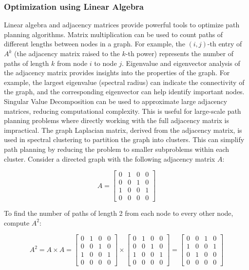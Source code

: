 \documentclass[12pt]{article}
\begin{document}
\subsubsection{Optimization using Linear Algebra}


Linear algebra and adjacency matrices provide powerful tools to optimize path planning algorithms. Matrix multiplication can be used to count paths of different lengths between nodes in a graph. For example, the \( (i,j) \)-th entry of \( A^k \) (the adjacency matrix raised to the \( k \)-th power) represents the number of paths of length \( k \) from node \( i \) to node \( j \).
Eigenvalue and eigenvector analysis of the adjacency matrix provides insights into the properties of the graph. For example, the largest eigenvalue (spectral radius) can indicate the connectivity of the graph, and the corresponding eigenvector can help identify important nodes. Singular Value Decomposition can be used to approximate large adjacency matrices, reducing computational complexity. This is useful for large-scale path planning problems where directly working with the full adjacency matrix is impractical. The graph Laplacian matrix, derived from the adjacency matrix, is used in spectral clustering to partition the graph into clusters. This can simplify path planning by reducing the problem to smaller subproblems within each cluster. Consider a directed graph with the following adjacency matrix \( A \):

\[
A = \begin{bmatrix}
0 & 1 & 0 & 0 \\
0 & 0 & 1 & 0 \\
1 & 0 & 0 & 1 \\
0 & 0 & 0 & 0
\end{bmatrix}
\]

To find the number of paths of length 2 from each node to every other node, compute \( A^2 \):

\[
A^2 = A \times A = \begin{bmatrix}
0 & 1 & 0 & 0 \\
0 & 0 & 1 & 0 \\
1 & 0 & 0 & 1 \\
0 & 0 & 0 & 0
\end{bmatrix}
\times
\begin{bmatrix}
0 & 1 & 0 & 0 \\
0 & 0 & 1 & 0 \\
1 & 0 & 0 & 1 \\
0 & 0 & 0 & 0
\end{bmatrix}
=
\begin{bmatrix}
0 & 0 & 1 & 0 \\
1 & 0 & 0 & 1 \\
0 & 1 & 0 & 0 \\
0 & 0 & 0 & 0
\end{bmatrix}
\]
\end{document}
